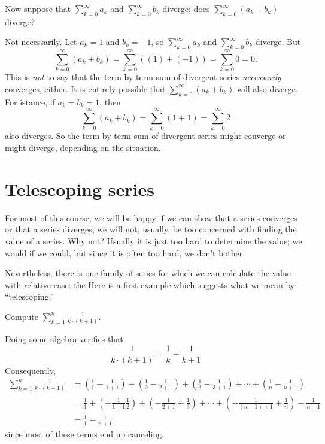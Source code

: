 \begin{example}
Now suppose that $\sum_{k=0}^\infty a_k$ and $\sum_{k=0}^\infty b_k$ diverge; does
$\sum_{k=0}^\infty (a_k+b_k)$ diverge?
\end{example}

\begin{solution}
  Not necessarily.  Let $a_k=1$ and $b_k=-1$, so $\sum_{k=0}^\infty
  a_k$ and $\sum_{k=0}^\infty b_k$ diverge. But
$$\sum_{k=0}^\infty (a_k+b_k)=\sum_{k=0}^\infty \left( \left( 1 \right) + \left( -1 \right) \right)=\sum_{k=0}^\infty 0 = 0.
$$
This is \textit{not} to say that the term-by-term sum of divergent
series \textit{necessarily} converges, either.  It is entirely
possible that $\sum_{k=0}^\infty (a_k+b_k)$ will also diverge.  For
istance, if $a_k=b_k=1$, then 
$$\sum_{k=0}^\infty (a_k+b_k)=\sum_{k=0}^\infty(1+1)=\sum_{k=0}^\infty 2
$$
also diverges.  So the term-by-term sum of divergent series might
converge or might diverge, depending on the situation.
\end{solution}

\section{Telescoping series}
\label{section:telescoping-series}

For most of this course, we will be happy if we can show that a series
converges or that a series diverges; we will not, usually, be too
concerned with finding the value of a series.  Why not?  Usually it is
just too hard to determine the value; we would if we could, but since
it is often too hard, we don't bother.

Nevertheless, there is one family of series for which we can calculate
the value with relative ease: the   Here
is a first example which suggests what we mean by ``telescoping.''

\begin{example}
Compute $\sum_{k=1}^n \frac{1}{k \cdot (k+1)}$.
\end{example}

\begin{solution}
  Doing some algebra verifies that
  $$
  \frac{1}{k \cdot (k+1)} = \frac{1}{k} - \frac{1}{k+1}
  $$
  Consequently,
\begin{align*}
\sum_{k=1}^n \frac{1}{k \cdot (k+1)} &=
\left( \frac{1}{1} - \frac{1}{1+1} \right) + 
\left( \frac{1}{2} - \frac{1}{2+1} \right) + 
\left( \frac{1}{3} - \frac{1}{3+1} \right) + \cdots + 
\left( \frac{1}{n} - \frac{1}{n+1} \right) \\
&=
\frac{1}{1} +
\left( - \frac{1}{1+1} \frac{1}{2} \right) + 
\left(- \frac{1}{2+1} + \frac{1}{3} \right) + \cdots + 
\left( - \frac{1}{(n-1)+1} + \frac{1}{n} \right) 
- \frac{1}{n+1} \\
&= \frac{1}{1} - \frac{1}{n+1}
\end{align*}
since most of these terms end up canceling.
\end{solution}

